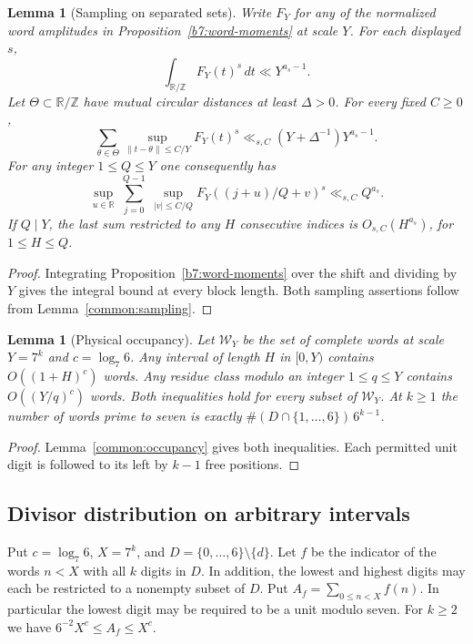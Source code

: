 \documentclass[11pt,a4paper]{article}
\theoremstyle{paperplain}
\newtheorem{lemma}[theorem]{Lemma}
\numberwithin{equation}{section}
\begin{document}
\begin{lemma}[Sampling on separated sets]\label{b7:digit-sampling}
Write \(F_Y\) for any of the normalized word amplitudes in
Proposition~\ref{b7:word-moments} at scale \(Y\). For each displayed \(s\),
\[
 \int_{\mathbb R/\mathbb Z}F_Y(t)^s\,dt\ll Y^{a_s-1}.
\]
Let \(\Theta\subset\mathbb R/\mathbb Z\) have mutual circular distances
at least \(\Delta>0\). For every fixed \(C\ge0\),
\[
 \sum_{\theta\in\Theta}\sup_{\|t-\theta\|\le C/Y}F_Y(t)^s
 \ll_{s,C}(Y+\Delta^{-1})Y^{a_s-1}.
\]
For any integer \(1\le Q\le Y\) one consequently has
\[
 \sup_{u\in\mathbb R}\ 
 \sum_{j=0}^{Q-1}\ \sup_{|v|\le C/Q} F_Y((j+u)/Q+v)^s
 \ll_{s,C}Q^{a_s}.
\]
If \(Q\mid Y\), the last sum restricted to any \(H\) consecutive
indices is \(O_{s,C}(H^{a_s})\), for \(1\le H\le Q\).
\end{lemma}

\begin{proof}
Integrating Proposition~\ref{b7:word-moments} over the shift and
dividing by $Y$ gives the integral bound at every block length.
Both sampling assertions follow from Lemma~\ref{common:sampling}.
\end{proof}

\begin{lemma}[Physical occupancy]\label{b7:digit-occupancy}
Let \(\mathcal W_Y\) be the set of complete words at scale \(Y=7^k\)
and \(c=\log_7 6\). Any interval of length \(H\) in \([0,Y)\)
contains \(O((1+H)^c)\) words. Any residue class modulo an integer
\(1\le q\le Y\) contains \(O((Y/q)^c)\) words.
Both inequalities hold for every subset of \(\mathcal W_Y\).
At \(k\ge1\) the number of words prime to seven is exactly
\(\#(D\cap\{1,\ldots,6\})\,6^{k-1}\).
\end{lemma}

\begin{proof}
Lemma~\ref{common:occupancy} gives both inequalities. Each permitted
unit digit is followed to its left by $k-1$ free positions.
\end{proof}


\subsection{Divisor distribution on arbitrary intervals}
\label{b7:type-i-section}

Put $c=\log_7 6$, $X=7^k$, and $D=\{0,\ldots,6\}\setminus\{d\}$.
Let $f$ be the indicator of the words $n<X$ with all $k$ digits in $D$.
In addition, the lowest and highest digits may each be restricted to a
nonempty subset of $D$. Put $A_f=\sum_{0\le n<X}f(n)$.
In particular the lowest digit may be required to be a unit modulo seven.
For $k\ge2$ we have $6^{-2}X^c\le A_f\le X^c$.
\end{document}
